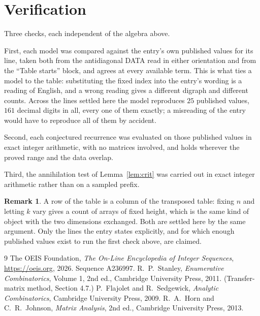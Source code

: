 \documentclass[11pt,a4paper]{article}
\theoremstyle{plain}
\theoremstyle{definition}
\newtheorem{remark}[theorem]{Remark}
\begin{document}
\section{Verification}

Three checks, each independent of the algebra above.

First, each model was compared against the entry's own published values for its line, taken
both from the antidiagonal DATA read in either orientation and from the ``Table starts''
block, and agrees at every available term. This is what ties a model to the table:
substituting the fixed index into the entry's wording is a reading of English, and a wrong
reading gives a different digraph and different counts. Across the lines settled here the
model reproduces $25$ published values, $161$ decimal digits in all, every one of
them exactly; a misreading of the entry would have to reproduce all of them by accident.

Second, each conjectured recurrence was evaluated on those published values in exact
integer arithmetic, with no matrices involved, and holds wherever the proved range and the
data overlap.

Third, the annihilation test of Lemma~\ref{lem:crit} was carried out in exact integer
arithmetic rather than on a sampled prefix.

\begin{remark}
A row of the table is a column of the transposed table: fixing $n$ and letting $k$ vary gives a
count of arrays of fixed height, which is the same kind of object with the two dimensions
exchanged. Both are settled here by the same argument. Only the lines the entry states
explicitly, and for which enough published values exist to run the first check above, are
claimed.
\end{remark}

\begin{thebibliography}{9}
 The OEIS Foundation, \emph{The On-Line Encyclopedia of Integer
Sequences}, \url{https://oeis.org}, 2026. Sequence A236997.
 R.~P.~Stanley, \emph{Enumerative Combinatorics}, Volume 1, 2nd ed.,
Cambridge University Press, 2011. (Transfer-matrix method, Section 4.7.)
 P.~Flajolet and R.~Sedgewick, \emph{Analytic Combinatorics}, Cambridge
University Press, 2009.
 R.~A.~Horn and C.~R.~Johnson, \emph{Matrix Analysis}, 2nd ed., Cambridge
University Press, 2013.
\end{thebibliography}
\end{document}
